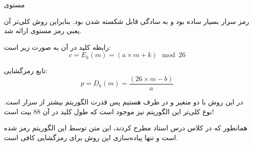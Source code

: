 \SubProblem
{مستوی}
{
رمز سزار بسیار ساده بود و به سادگی قابل شکسته شدن بود.
بنابراین روش کلی‌تر آن یعنی رمز مستوی
ارائه شد.

رابطه کلید در آن به صورت زیر است:
\begin{equation*}
    c = E_k(m) = (a \times m + k) \mod 26
\end{equation*}

تابع رمزگشایی:
\begin{equation*}
    p = D_k(m) = \frac{(26 \times m - b)}{a}
\end{equation*}

در این روش با دو متغیر
 و 
در طرف هستیم پس قدرت الگوریتم بیشتر از سزار است.
نوع کلی‌تر این الگوریتم نیز موجود است که طول کلید در آن 88 بیت است!

همانطور که در کلاس درس استاد مطرح کردند، این متن توسط این الگوریتم رمز شده است و تنها پیاده‌سازی این روش برای رمزگشایی کافی است.
}
